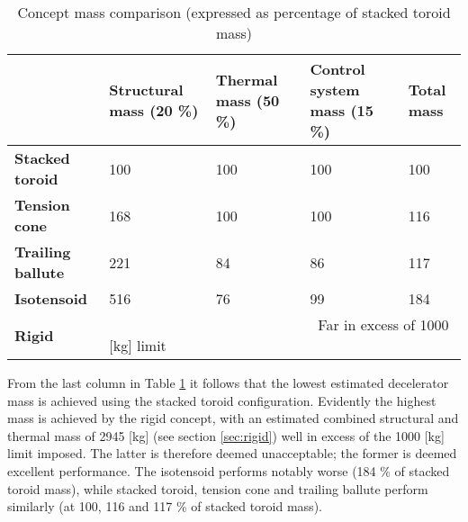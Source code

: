 \begin{table}[h]

\caption{Concept mass comparison (expressed as percentage of stacked toroid mass)}\label{tab:cmass}
\hspace{-10mm}
\begin{tabular}{|p{}|p{}|p{}|p{}||p{}|}

\hline
                          & \textbf{Structural mass (20 \%)} & \textbf{Thermal mass (50 \%)} & \textbf{Control system mass (15 \%)} & \textbf{Total mass} \\ \hline
\textbf{Stacked toroid}   &  100                                 & 100                          & 100                                      &\cellcolor{green!70}  100                           \\ \hline
\textbf{Tension cone}     &  168                               & 100                               &  100                                     &\cellcolor{green!70} 116                                 \\ \hline
\textbf{Trailing ballute} &  221                                 & 84                               & 86                                      &\cellcolor{green!70} 117 \\ \hline
\textbf{Isotensoid}       &  516                                 & 76                               & 99                                      &\cellcolor{yellow!75} 184 \\ \hline \hline
\textbf{Rigid}            &  \multicolumn{4}{|p{0.762\textwidth}|}{\cellcolor{red!60} ~~~~~~~~~~~~~~~~~~~~~~~~~~~~~Far in excess of 1000 [kg] limit}    \\ \hline
\end{tabular}
\end{table}

From the last column in Table \ref{tab:cmass} it follows that the lowest estimated decelerator mass is achieved using the stacked toroid configuration. Evidently the highest mass is achieved by the rigid concept, with an estimated combined structural and thermal mass of 2945 [kg] (see section \ref{sec:rigid}) well in excess of the 1000 [kg] limit imposed. The latter is therefore deemed unacceptable; the former is deemed excellent performance. The isotensoid performs notably worse (184 \% of stacked toroid mass), while stacked toroid, tension cone and trailing ballute perform similarly (at 100, 116 and 117 \% of stacked toroid mass).

